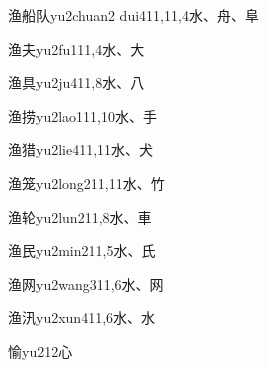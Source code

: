 \begin{EntryWithPhonetic}{渔船队}{yu2chuan2 dui4}{11,11,4}{⽔、⾈、⾩}
\end{EntryWithPhonetic}

\begin{EntryWithPhonetic}{渔夫}{yu2fu1}{11,4}{⽔、⼤}
\end{EntryWithPhonetic}

\begin{EntryWithPhonetic}{渔具}{yu2ju4}{11,8}{⽔、⼋}
\end{EntryWithPhonetic}

\begin{EntryWithPhonetic}{渔捞}{yu2lao1}{11,10}{⽔、⼿}
\end{EntryWithPhonetic}

\begin{EntryWithPhonetic}{渔猎}{yu2lie4}{11,11}{⽔、⽝}
\end{EntryWithPhonetic}

\begin{EntryWithPhonetic}{渔笼}{yu2long2}{11,11}{⽔、⽵}
\end{EntryWithPhonetic}

\begin{EntryWithPhonetic}{渔轮}{yu2lun2}{11,8}{⽔、⾞}
\end{EntryWithPhonetic}

\begin{EntryWithPhonetic}{渔民}{yu2min2}{11,5}{⽔、⽒}
\end{EntryWithPhonetic}

\begin{EntryWithPhonetic}{渔网}{yu2wang3}{11,6}{⽔、⽹}
\end{EntryWithPhonetic}

\begin{EntryWithPhonetic}{渔汛}{yu2xun4}{11,6}{⽔、⽔}
\end{EntryWithPhonetic}

\begin{EntryWithPhonetic}{愉}{yu2}{12}{⼼}
\end{EntryWithPhonetic}


